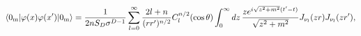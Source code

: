 \begin{equation}
\langle 0_{{\rm m}}|\varphi (x)\varphi (x^{\prime })|0_{{\rm
m}}\rangle = \frac{1}{2nS_{D}\sigma ^{D-1}}\sum_{l=0}^{\infty
}\frac{2l+n}{(rr^{\prime })^{n/2}} C_{l}^{n/2}(\cos \theta
)\int_{0}^{\infty }dz\,\frac{ze^{i\sqrt{z^{2}+m^{2}}(t^{\prime
}-t)}}{\sqrt{z^{2}+m^{2}}}J_{\nu _{l} }(zr)J_{\nu _{l}
}(zr^{\prime }), \label{Mink}
\end{equation}

